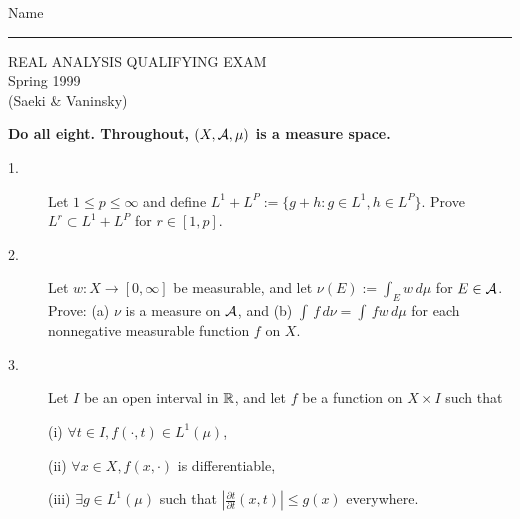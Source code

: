 \documentclass[bbb]{report}
\def\ds{\displaystyle}
\def\R{{\Bbb R}}
\begin{document}
\begin{Large}

\hfill Name \rule{2.5in}{.01in}
\par
\vspace{.25in}

\begin{center}
   REAL ANALYSIS QUALIFYING EXAM \\
   Spring 1999 \\
   (Saeki \& Vaninsky) \\
\end{center}


\vspace{.1in}

\end{Large}

\begin{large}


\begin{center} {\bf
Do all eight. Throughout, $(X,{\cal A},\mu)$
is a measure space.
} \end{center}


\vspace{.25in}


\begin{description}

\item[1.]
Let $1\leq p\leq \infty$ and define $L^1+L^P:=\{g+h:g\in L^1,h\in L^P\}$.
Prove $L^r\subset L^1+L^P$ for $r\in[1,p]$.



\vspace{.15in}

\item[2.]
Let $w:X\to[0,\infty]$ be measurable, and let $\nu(E):=\int_Ew\,d\mu$ for
$E\in {\cal A}$. Prove: (a) $\nu$ is a measure on ${\cal A}$,
and (b) $\int\,f\,d\nu=\int\, fw\, d\mu$ for each nonnegative
measurable function $f$ on $X$.

\vspace{.15in}

\item[3.]
Let $I$ be an open interval in $\R$, and let $f$ be a function on
$X\times I$ such that

\item[\quad] (i)
$\forall t\in I,f(\cdot,t)\in L^1(\mu)$,

\item[\quad] (ii)
$\forall x\in X,f(x,\cdot)$ is differentiable,

\item[\quad] (iii)
$\exists g\in L^1(\mu)$ such that $\left| \ds\frac{\partial t}{\partial t}
(x,t)\right| \leq g(x)$ everywhere.


\end{description}
\end{large}
\end{document}

